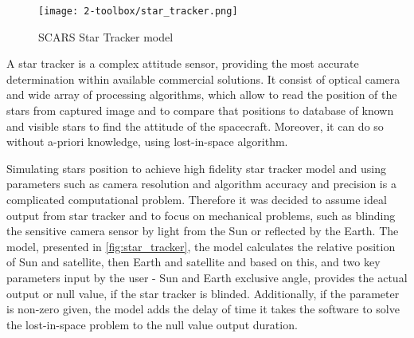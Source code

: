         \begin{figure}[H]
            \centering
            \texttt{[image: 2-toolbox/star\_tracker.png]}
            \caption{SCARS Star Tracker model}
            \label{fig:star_tracker}
        \end{figure}

        A star tracker is a complex attitude sensor, providing the most accurate determination within available commercial solutions. It consist of optical camera and wide array of processing algorithms, which allow to read the position of the stars from captured image and to compare that positions to database of known and visible stars to find the attitude of the spacecraft. Moreover, it can do so without a-priori knowledge, using lost-in-space algorithm\cite{delabie2016star}.

        Simulating stars position to achieve high fidelity star tracker model and using parameters such as camera resolution and algorithm accuracy and precision is a complicated computational problem. Therefore it was decided to assume ideal output from star tracker and to focus on mechanical problems, such as blinding the sensitive camera sensor by light from the Sun or reflected by the Earth. The model, presented in \autoref{fig:star_tracker}, the model calculates the relative position of Sun and satellite, then Earth and satellite and based on this, and two key parameters input by the user - Sun and Earth exclusive angle, provides the actual output or null value, if the star tracker is blinded. Additionally, if the parameter is non-zero given, the model adds the delay of time it takes the software to solve the lost-in-space problem to the null value output duration.

